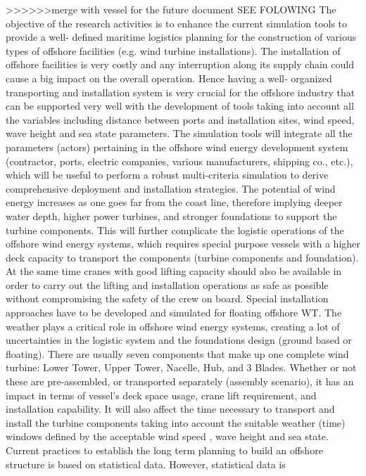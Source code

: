 >>>>>>merge with vessel for the future document SEE FOLOWING
The objective of the research activities is to enhance the current simulation tools to provide a well- defined maritime logistics planning for the
construction of various types of offshore facilities (e.g. wind turbine installations). The installation of offshore facilities is very costly and any
interruption along its supply chain could cause a big impact on the overall operation. Hence having a well- organized transporting and installation
system is very crucial for the offshore industry that can be supported very well with the development of tools taking into account all the variables
including distance between ports and installation sites, wind speed, wave height and sea state parameters. The simulation tools will integrate all
the parameters (actors) pertaining in the offshore wind energy development system (contractor, ports, electric companies, various
manufacturers, shipping co., etc.), which will be useful to perform a robust multi-criteria simulation to derive comprehensive deployment and
installation strategies.
The potential of wind energy increases as one goes far from the coast line, therefore implying deeper water depth, higher power turbines, and
stronger foundations to support the turbine components. This will further complicate the logistic operations of the offshore wind energy systems,
which requires special purpose vessels with a higher deck capacity to transport the components (turbine components and foundation). At the
same time cranes with good lifting capacity should also be available in order to carry out the lifting and installation operations as safe as possible
without compromising the safety of the crew on board. Special installation approaches have to be developed and simulated for floating offshore
WT. The weather plays a critical role in offshore wind energy systems, creating a lot of uncertainties in the logistic system and the foundations
design (ground based or floating). There are usually seven components that make up one complete wind turbine: Lower Tower, Upper Tower,
Nacelle, Hub, and 3 Blades. Whether or not these are pre-assembled, or transported separately (assembly scenario), it has an impact in terms of
vessel's deck space usage, crane lift requirement, and installation capability. It will also affect the time necessary to transport and install the
turbine components taking into account the suitable weather (time) windows defined by the acceptable wind speed , wave height and sea state.
Current practices to establish the long term planning to build an offshore structure is based on statistical data. However, statistical data is
